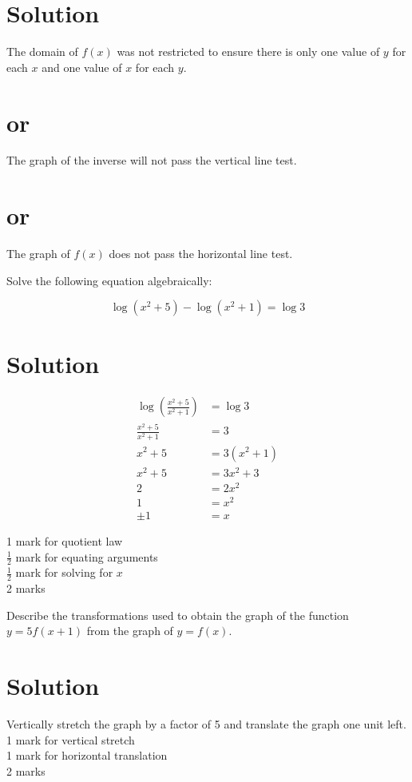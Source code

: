\documentclass[10pt]{article}
\begin{document}
\section*{Solution}
The domain of $f(x)$ was not restricted to ensure there is only one value of $y$ for each $x$ and one value of $x$ for each $y$.

\section*{or}
The graph of the inverse will not pass the vertical line test.

\section*{or}
The graph of $f(x)$ does not pass the horizontal line test.

Solve the following equation algebraically:

$$
\log \left(x^{2}+5\right)-\log \left(x^{2}+1\right)=\log 3
$$

\section*{Solution}
$$
\begin{aligned}
\log \left(\frac{x^{2}+5}{x^{2}+1}\right) & =\log 3 \\
\frac{x^{2}+5}{x^{2}+1} & =3 \\
x^{2}+5 & =3\left(x^{2}+1\right) \\
x^{2}+5 & =3 x^{2}+3 \\
2 & =2 x^{2} \\
1 & =x^{2} \\
\pm 1 & =x
\end{aligned}
$$

1 mark for quotient law\\
$\frac{1}{2}$ mark for equating arguments\\
$\frac{1}{2}$ mark for solving for $x$\\
2 marks

Describe the transformations used to obtain the graph of the function $y=5 f(x+1)$ from the graph of $y=f(x)$.

\section*{Solution}
Vertically stretch the graph by a factor of 5 and translate the graph one unit left.\\
1 mark for vertical stretch\\
1 mark for horizontal translation\\
2 marks
\end{document}
